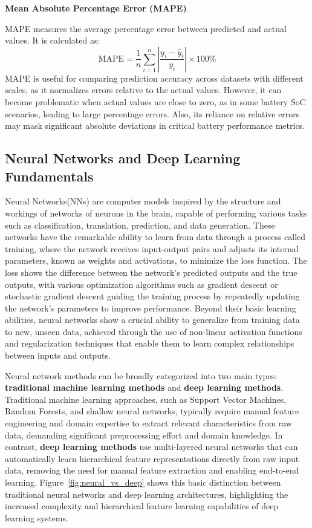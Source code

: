 \vspace{1cm}
\textbf{Mean Absolute Percentage Error (MAPE)}

MAPE measures the average percentage error between predicted and actual values. It is calculated as:
\begin{equation}
\text{MAPE} = \frac{1}{n} \sum_{i=1}^{n} \left| \frac{y_i - \hat{y}_i}{y_i} \right| \times 100\%
\end{equation}
MAPE is useful for comparing prediction accuracy across datasets with different scales, as it normalizes errors relative to the actual values. However, it can become problematic when actual values are close to zero, as in some battery SoC scenarios, leading to large percentage errors. Also, its reliance on relative errors may mask significant absolute deviations in critical battery performance metrics.

\vspace{1cm}
\subsection{Neural Networks and Deep Learning Fundamentals}

Neural Networks(NNs) are computer models inspired by the structure and workings of networks of neurons in the brain, capable of performing various tasks such as classification, translation, prediction, and data generation. These networks have the remarkable ability to learn from data through a process called training, where the network receives input-output pairs and adjusts its internal parameters, known as weights and activations, to minimize the loss function. The loss shows the difference between the network's predicted outputs and the true outputs, with various optimization algorithms such as gradient descent or stochastic gradient descent guiding the training process by repeatedly updating the network's parameters to improve performance. Beyond their basic learning abilities, neural networks show a crucial ability to generalize from training data to new, unseen data, achieved through the use of non-linear activation functions and regularization techniques that enable them to learn complex relationships between inputs and outputs.

Neural network methods can be broadly categorized into two main types: \textbf{traditional machine learning methods} and \textbf{deep learning methods}. Traditional machine learning approaches, such as Support Vector Machines, Random Forests, and shallow neural networks, typically require manual feature engineering and domain expertise to extract relevant characteristics from raw data, demanding significant preprocessing effort and domain knowledge. In contrast, \textbf{deep learning methods} use multi-layered neural networks that can automatically learn hierarchical feature representations directly from raw input data, removing the need for manual feature extraction and enabling end-to-end learning. Figure~\ref{fig:neural_vs_deep} shows this basic distinction between traditional neural networks and deep learning architectures, highlighting the increased complexity and hierarchical feature learning capabilities of deep learning systems.

